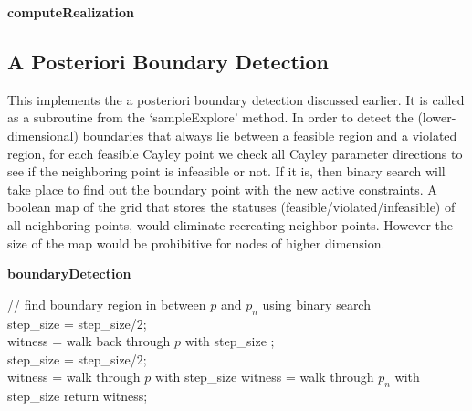 \begin{algorithm}
\label{realization}

 {\bf computeRealization}\\
 \BlankLine
 	{
 	}

 \caption{computeRealization}
\end{algorithm}



\subsection{A Posteriori Boundary Detection}
This implements the a posteriori boundary detection discussed earlier.
It is called as a subroutine from the `sampleExplore' method. In
order to detect the (lower-dimensional) boundaries that always lie between a
feasible region and a violated region, for each feasible Cayley point we check
all Cayley parameter directions to see if the neighboring point is infeasible
or not. If it is, then binary search will take place to find out the
boundary point with the new active constraints. A boolean map of the grid that stores
the statuses (feasible/violated/infeasible) of all neighboring points, would
eliminate recreating neighbor points. However the size of the map would be
prohibitive for nodes of higher dimension.

\begin{algorithm} [htbp]

 {\bf boundaryDetection}\\
 \BlankLine

	{
		{
			// find boundary region in between $p$ and $p_n$ using binary search \\

			step\_size = step\_size/2;\\
			witness = walk back through $p$ with step\_size ;\\

			{
				step\_size = step\_size/2; 	\\
				{	witness = walk through $p$ with step\_size }
				{	witness = walk through $p_n$ with step\_size }
			}
		}
	}
	return witness;\\

 \caption{ boundaryDetection
\label{alg:boundaryDetection}}
\end{algorithm}


